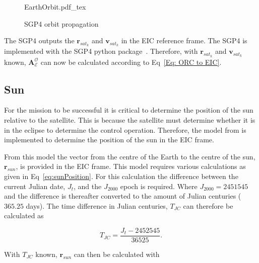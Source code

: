 \begin{figure}[!htb]
	\centering
	\def\svgwidth{10cm}
	{EarthOrbit.pdf_tex}
	\caption{SGP4 orbit propagation}
	\label{fig:EarthOrbit}
\end{figure}


The SGP4 outputs the $\mathbf{r}_{sat_k}$ and $\mathbf{v}_{sat_k}$ in the EIC reference frame. The SGP4 is implemented with the SGP4 python package~\cite{sgp4}. Therefore, with $\mathbf{r}_{sat_k}$ and $\mathbf{v}_{sat_k}$ known, $\boldsymbol{A}^{\mathcal{O}}_{\mathcal{E}}$ can now be calculated according to Eq~\ref{Eq: ORC to EIC}.

\subsection{Sun}
For the mission to be successful it is critical to determine the position of the sun relative to the satellite. This is because the satellite must determine whether it is in the eclipse to determine the control operation. Therefore, the model from \cite{vallado2001fundamentals} is implemented to determine the position of the sun in the EIC frame.

From this model the vector from the centre of the Earth to the centre of the sun, $\mathbf{r}_{sun}$, is provided in the EIC frame. This model requires various calculations as given in Eq~\ref{eq:sunPosition}. For this calculation the difference between the current Julian date, $J_t$, and the $J_{2000}$ epoch is required. Where $J_{2000} = \num{2451545}$ and the difference is thereafter converted to the amount of Julian centuries ($\num{365.25}$ days). The time difference in Julian centuries, $T_{JC}$ can therefore be calculated as 

\begin{equation}
T_{JC} = \frac{J_t - \num{2452545}}{\num{36525}}.
\end{equation}

With $T_{JC}$ known, $\mathbf{r}_{sun}$ can then be calculated with

